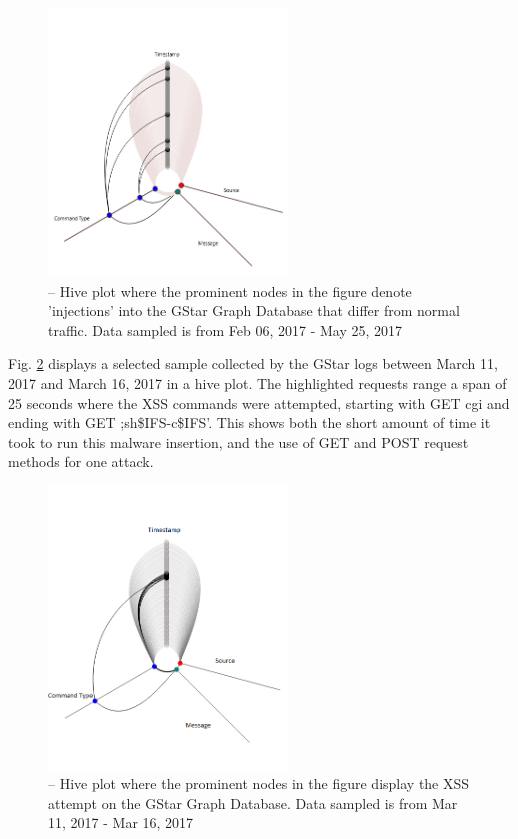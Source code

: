 \begin{figure}[h]
\centering
\includegraphics[width=2.5in]{images/uniqHive.png} 
\caption{-- Hive plot where the prominent nodes in the figure denote 'injections' into the GStar Graph Database that differ from normal traffic. Data sampled is from Feb 06, 2017 - May 25, 2017}
\label{fig:uniqHive}
\end{figure}

\noindent Fig. \ref{fig:XSS} displays a selected sample collected by the GStar logs between March 11, 2017 and March 16, 2017 in a hive plot. The highlighted requests range a span of 25 seconds where the XSS commands were attempted, starting with GET cgi and ending with GET ;sh\$IFS-c\$IFS'. This shows both the short amount of time it took to run this malware insertion, and the use of GET and POST request methods for one attack.

\begin{figure}[h]
\centering
\includegraphics[width=2.5in]{images/XSS.png} 
\caption{-- Hive plot where the prominent nodes in the figure display the XSS attempt on the GStar Graph Database. Data sampled is from Mar 11, 2017 - Mar 16, 2017}
\label{fig:XSS}
\end{figure}

